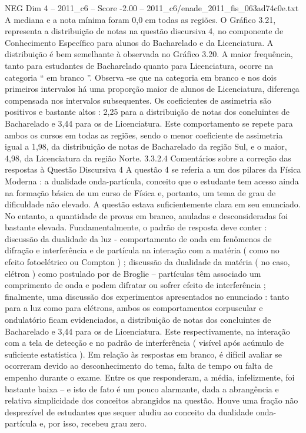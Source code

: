 \begin{textsample}{NEG Dim 4 – 2011\_c6 – Score -2.00 – 2011\_c6/enade\_2011\_fis\_063ad74c0e.txt}
A mediana e a nota mínima foram 0,0 em todas as regiões.
O Gráfico 3.21, representa a distribuição de notas na questão discursiva 4, no componente de Conhecimento Específico para alunos do Bacharelado e da Licenciatura.
A distribuição é bem semelhante à observada no Gráfico 3.20.
A maior frequência, tanto para estudantes de Bacharelado quanto para Licenciatura, ocorre na categoria “ em branco ”.
Observa -se que na categoria em branco e nos dois primeiros intervalos há uma proporção maior de alunos de Licenciatura, diferença compensada nos intervalos subsequentes.
Os coeficientes de assimetria são positivos e bastante altos : 2,25 para a distribuição de notas dos concluintes de Bacharelado e 3,44 para os de Licenciatura.
Este comportamento se repete para ambos os cursos em todas as regiões, sendo o menor coeficiente de assimetria igual a 1,98, da distribuição de notas de Bacharelado da região Sul, e o maior, 4,98, da Licenciatura da região Norte. 3.3.2.4 Comentários sobre a correção das respostas à Questão Discursiva 4 A questão 4 se referia a um dos pilares da Física Moderna : a dualidade onda-partícula, conceito que o estudante tem acesso ainda na formação básica de um curso de Física e, portanto, um tema de grau de dificuldade não elevado.
A questão estava suficientemente clara em seu enunciado.
No entanto, a quantidade de provas em branco, anuladas e desconsideradas foi bastante elevada.
Fundamentalmente, o padrão de resposta deve conter : discussão da dualidade da luz - comportamento de onda em fenômenos de difração e interferência e de partícula na interação com a matéria ( como no efeito fotoelétrico ou Compton ) ; discussão da dualidade da matéria ( no caso, elétron ) como postulado por de Broglie – partículas têm associado um comprimento de onda e podem difratar ou sofrer efeito de interferência ; finalmente, uma discussão dos experimentos apresentados no enunciado : tanto para a luz como para elétrons, ambos os comportamentos corpuscular e ondulatório ficam evidenciados, a distribuição de notas dos concluintes de Bacharelado e 3,44 para os de Licenciatura.
Este respectivamente, na interação com a tela de detecção e no padrão de interferência ( visível após acúmulo de suficiente estatística ).
Em relação às respostas em branco, é difícil avaliar se ocorreram devido ao desconhecimento do tema, falta de tempo ou falta de empenho durante o exame.
Entre os que responderam, a média, infelizmente, foi bastante baixa – e isto de fato é um pouco alarmante, dada a abrangência e relativa simplicidade dos conceitos abrangidos na questão.
Houve uma fração não desprezível de estudantes que sequer aludiu ao conceito da dualidade onda-partícula e, por isso, recebeu grau zero.

\end{textsample}
